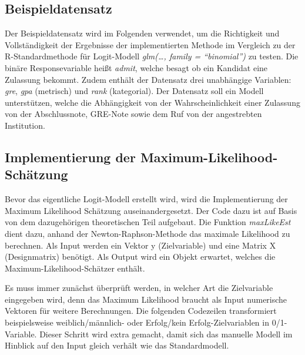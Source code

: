 \documentclass[12pt,]{article}
\newenvironment{Shaded}{\begin{snugshade}}{\end{snugshade}}
\newcommand{\KeywordTok}[1]{\textcolor[rgb]{0.13,0.29,0.53}{\textbf{#1}}}
\newcommand{\DataTypeTok}[1]{\textcolor[rgb]{0.13,0.29,0.53}{#1}}
\newcommand{\DecValTok}[1]{\textcolor[rgb]{0.00,0.00,0.81}{#1}}
\newcommand{\StringTok}[1]{\textcolor[rgb]{0.31,0.60,0.02}{#1}}
\newcommand{\CommentTok}[1]{\textcolor[rgb]{0.56,0.35,0.01}{\textit{#1}}}
\newcommand{\ControlFlowTok}[1]{\textcolor[rgb]{0.13,0.29,0.53}{\textbf{#1}}}
\newcommand{\OperatorTok}[1]{\textcolor[rgb]{0.81,0.36,0.00}{\textbf{#1}}}
\newcommand{\NormalTok}[1]{#1}
\begin{document}
\subsection{Beispieldatensatz}\label{beispieldatensatz}

Der Beispieldatensatz wird im Folgenden verwendet, um die Richtigkeit
und Vollständigkeit der Ergebnisse der implementierten Methode im
Vergleich zu der R-Standardmethode für Logit-Modell \emph{glm(\ldots{},
family = ``binomial'')} zu testen. Die binäre Responsevariable heißt
\emph{admit}, welche besagt ob ein Kandidat eine Zulassung bekommt.
Zudem enthält der Datensatz drei unabhängige Variablen: \emph{gre},
\emph{gpa} (metrisch) und \emph{rank} (kategorial). Der Datensatz soll
ein Modell unterstützen, welche die Abhängigkeit von der
Wahrscheinlichkeit einer Zulassung von der Abschlussnote, GRE-Note sowie
dem Ruf von der angestrebten Institution.

\subsection{Implementierung der
Maximum-Likelihood-Schätzung}\label{implementierung-der-maximum-likelihood-schatzung}

Bevor das eigentliche Logit-Modell erstellt wird, wird die
Implementierung der Maximum Likelihood Schätzung auseinandergesetzt. Der
Code dazu ist auf Basis von dem dazugehörigen theoretischen Teil
aufgebaut. Die Funktion \emph{maxLikeEst} dient dazu, anhand der
Newton-Raphson-Methode das maximale Likelihood zu berechnen. Als Input
werden ein Vektor y (Zielvariable) und eine Matrix X (Designmatrix)
benötigt. Als Output wird ein Objekt erwartet, welches die
Maximum-Likelihood-Schätzer enthält.

Es muss immer zunächst überprüft werden, in welcher Art die Zielvariable
eingegeben wird, denn das Maximum Likelihood braucht als Input
numerische Vektoren für weitere Berechnungen. Die folgenden Codezeilen
transformiert beispielsweise weiblich/männlich- oder Erfolg/kein
Erfolg-Zielvariablen in 0/1-Variable. Dieser Schritt wird extra gemacht,
damit sich das manuelle Modell im Hinblick auf den Input gleich verhält
wie das Standardmodell.

\begin{Shaded}
\end{Shaded}
\end{document}
